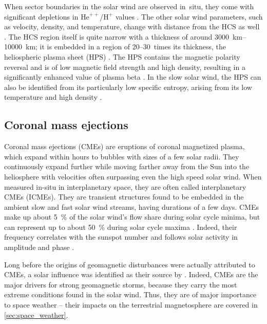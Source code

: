 When sector boundaries in the solar wind are observed in~situ, they come with significant depletions in $\text{He}^{++}\!/\text{H}^+$ values \citep{Borrini1981}. The other solar wind parameters, such as velocity, density, and temperature, change with distance from the HCS as well \citep{Smith2001}. The HCS region itself is quite narrow with a thickness of around \SIrange{3000}{10000}{\km}; it is embedded in a region of 20--30~times its thickness, the heliospheric plasma sheet (HPS) \citep{Winterhalter1994}. The HPS contains the magnetic polarity reversal and is of low magnetic field strength and high density, resulting in a significantly enhanced value of plasma beta \citep{Crooker2004}. In the slow solar wind, the HPS can also be identified from its particularly low specific entropy, arising from its low temperature and high density \citep{Kilpua2016}.


\subsection{Coronal mass ejections}
\label{sec:coronal_mass_ejections}
Coronal mass ejections (CMEs) are eruptions of coronal magnetized plasma, which expand within hours to bubbles with sizes of a few solar radii. They continuously expand further while moving farther away from the Sun into the heliosphere with velocities often surpassing even the high speed solar wind. When measured in-situ in interplanetary space, they are often called interplanetary CMEs (ICMEs). They are transient structures found to be embedded in the ambient slow and fast solar wind streams, having durations of a few days. CMEs make up about \SI{5}{\percent} of the solar wind's flow share during solar cycle minima, but can represent up to about \SI{50}{\percent} during solar cycle maxima \citep{Richardson2012}. Indeed, their frequency correlates with the sunspot number \citep{Hildner1976} and follows solar activity in amplitude and phase \citep{Webb1991}.

Long before the origins of geomagnetic disturbances were actually attributed to CMEs, a solar influence was identified as their source by \citet{Carrington1859}. Indeed, CMEs are the major drivers for strong geomagnetic storms, because they carry the most extreme conditions found in the solar wind. Thus, they are of major importance to space weather -- their impacts on the terrestrial magnetosphere are covered in \autoref{sec:space_weather}.

